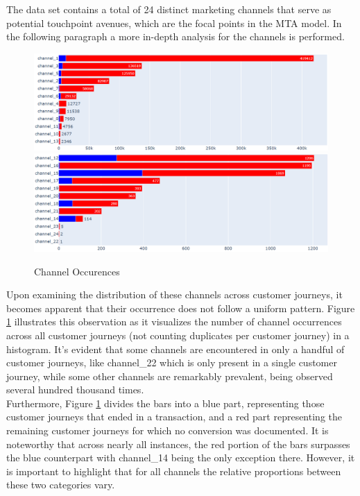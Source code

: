 The data set contains a total of 24 distinct marketing channels that serve as potential touchpoint avenues, which are the focal points in the MTA model. In the following paragraph a more in-depth analysis for the channels is performed.\\
\begin{figure}[h]
\centering
\includegraphics[width=16cm]{images/chan1.png}
\includegraphics[width=16cm]{images/chan2.png}
\caption{Channel Occurences}
\label{fig:channel1}
\end{figure}
Upon examining the distribution of these channels across customer journeys, it becomes apparent that their occurrence does not follow a uniform pattern. Figure \ref{fig:channel1} illustrates this observation as it visualizes the number of channel occurrences across all customer journeys (not counting duplicates per customer journey) in a histogram. It's evident that some channels are encountered in only a handful of customer journeys, like channel\_22 which is only present in a single customer journey, while some other channels are remarkably prevalent, being observed several hundred thousand times.\\

Furthermore, Figure \ref{fig:channel1} divides the bars into a blue part, representing those customer journeys that ended in a transaction, and a red part representing the remaining customer journeys for which no conversion was documented. It is noteworthy that across nearly all instances, the red portion of the bars surpasses the blue counterpart with channel\_14 being the only exception there. However, it is important to highlight that for all channels the relative proportions between these two categories vary.

